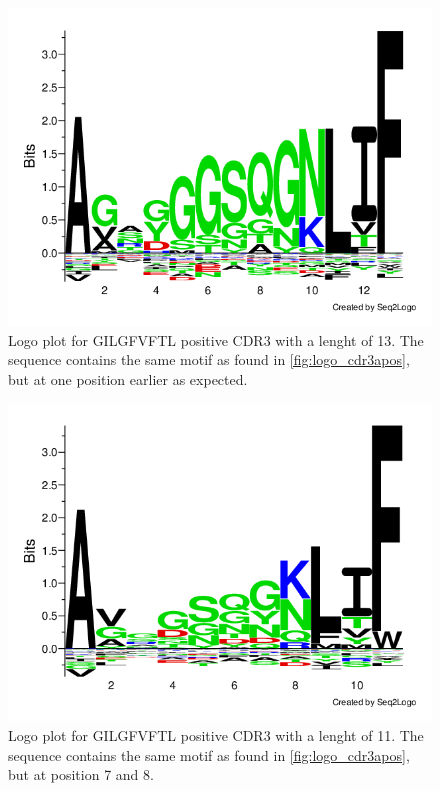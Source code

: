 \begin{figure}[H]
    \centering
    \includegraphics[width=\linewidth]{figures/seq2logo_cd3a_pos_13.png}
    \caption{Logo plot for GILGFVFTL positive CDR3{\textalpha} with a lenght of 13. The sequence contains the same motif as found in \ref{fig:logo_cdr3apos}, but at one position earlier as expected.}
    \label{fig:seq_cdr3a13}
\end{figure}

\begin{figure}[H]
    \centering
    \includegraphics[width=\linewidth]{figures/seq2logo_cd3a_pos_11.png}
    \caption{Logo plot for GILGFVFTL positive CDR3{\textalpha} with a lenght of 11. The sequence contains the same motif as found in \ref{fig:logo_cdr3apos}, but at position 7 and 8.}
    \label{fig:seq_cdr3a11}
\end{figure}